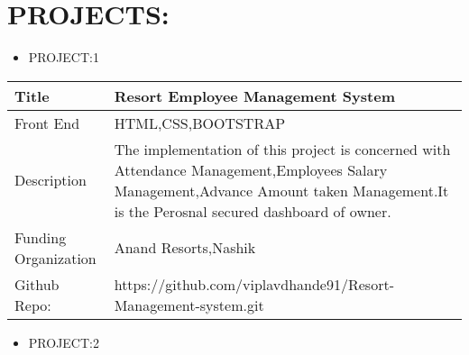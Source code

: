 \documentclass[a4paper,10pt]{article}
\begin{document}
\vspace{5mm}


\section{PROJECTS:}

\renewcommand{\labelitemi}{$\blacksquare$}
 
 
 \begin{itemize}
   \item {\large PROJECT:1}
   
 \end{itemize}


\begin{tabu} to 0.9\textwidth { | X[l] | X[2.5] | }
 \hline
 \large Title & Resort Employee Management System\\
 
 \hline
\large Front End  & HTML,CSS,BOOTSTRAP\\
 
\hline
\large Description & The implementation of this project is concerned with Attendance Management,Employees Salary Management,Advance Amount taken Management.It is the Perosnal secured dashboard of owner. \\
\hline
\large Funding Organization & Anand Resorts,Nashik \\
\hline

\large Github Repo: & https://github.com/viplavdhande91/Resort-Management-system.git \\
 

 
\hline
\end{tabu}
 
 
 
 
\vspace{5mm}

 
 \renewcommand{\labelitemi}{$\blacksquare$}
 
 
 \begin{itemize}
   \item {\large PROJECT:2}
   
 \end{itemize}
\end{document}
